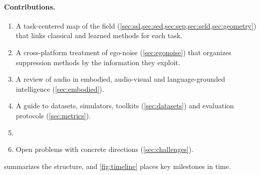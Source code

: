 \paragraph{Contributions.}
\begin{enumerate}
\item A task-centered map of the field (\cref{sec:ssl,sec:sed,sec:sep,sec:seld,sec:geometry}) that links classical and learned methods for each task.
\item A cross-platform treatment of ego-noise (\cref{sec:egonoise}) that organizes suppression methods by the information they exploit.
\item A review of audio in embodied, audio-visual and language-grounded intelligence (\cref{sec:embodied}).
\item A guide to datasets, simulators, toolkits (\cref{sec:datasets}) and evaluation protocols (\cref{sec:metrics}).
\item {}
\item Open problems with concrete directions (\cref{sec:challenges}).
\end{enumerate}
 summarizes the structure, and \cref{fig:timeline} places key milestones in time.

